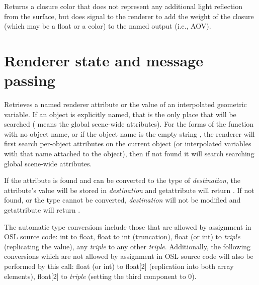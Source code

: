\documentclass[11pt,letterpaper]{book}
\def\color{{\cf color}\xspace}
\def\colorclosure{{\cf closure color}\xspace}
\begin{document}
\apiitem{\colorclosure\ {\ce debug} (string outputname)}
Returns a \colorclosure that does not represent any additional light
reflection from the surface, but does signal to the renderer to add
the weight of the closure (which may be a {\cf float} or a \color)
to the named output (i.e., AOV).
\apiend




\newpage
\section{Renderer state and message passing}
\label{sec:stdlib:state}

Retrieves a named renderer attribute or the value of an interpolated
geometric variable.
If an object is explicitly named, that is the only place that will be
searched ( means the global scene-wide attributes).  For the
forms of the function with no object name, or if the object name is the
empty string \qkw{}, the renderer will first search
per-object attributes on the current object (or interpolated variables
with that name attached to the object), then if not found it will search
searching global scene-wide attributes.  

If the attribute is found and can be converted to the type of
\emph{destination}, the attribute's value will be stored in
\emph{destination} and {\cf getattribute} will return {}.  If not
found, or the type cannot be converted, \emph{destination} will not be
modified and {\cf getattribute} will return {}.

The automatic type conversions include those that are allowed by
assignment in OSL source code: {\cf int} to {\cf float}, {\cf float} to
{\cf int} (truncation), {\cf float} (or {\cf int}) to \emph{triple}
(replicating the value), any \emph{triple} to any other \emph{triple}.
Additionally, the following conversions which are not allowed by
assignment in OSL source code will also be performed by this call: 
{\cf float} (or {\cf int}) to {\cf float[2]} (replication into both
array elements), {\cf float[2]} to \emph{triple} (setting the third
component to 0).
\end{document}
